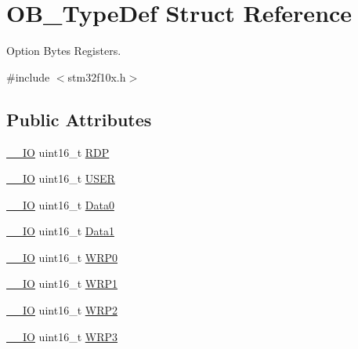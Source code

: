 \hypertarget{struct_o_b___type_def}{}\section{O\+B\+\_\+\+Type\+Def Struct Reference}
\label{struct_o_b___type_def}


Option Bytes Registers.  




{\ttfamily \#include $<$stm32f10x.\+h$>$}

\subsection*{Public Attributes}
\begin{DoxyCompactItemize}
\item 
\hyperlink{core__sc300_8h_aec43007d9998a0a0e01faede4133d6be}{\+\_\+\+\_\+\+IO} uint16\+\_\+t \hyperlink{struct_o_b___type_def_ad9f9ae594003c39cc27f147e29a130bb}{R\+DP}
\item 
\hyperlink{core__sc300_8h_aec43007d9998a0a0e01faede4133d6be}{\+\_\+\+\_\+\+IO} uint16\+\_\+t \hyperlink{struct_o_b___type_def_ab0292062a80446c97dac24604bd8ed8e}{U\+S\+ER}
\item 
\hyperlink{core__sc300_8h_aec43007d9998a0a0e01faede4133d6be}{\+\_\+\+\_\+\+IO} uint16\+\_\+t \hyperlink{struct_o_b___type_def_a7570c0ba4b4d31c6061d595279e6b36e}{Data0}
\item 
\hyperlink{core__sc300_8h_aec43007d9998a0a0e01faede4133d6be}{\+\_\+\+\_\+\+IO} uint16\+\_\+t \hyperlink{struct_o_b___type_def_a4e0e4a89db7004fb08a8a19129e9970e}{Data1}
\item 
\hyperlink{core__sc300_8h_aec43007d9998a0a0e01faede4133d6be}{\+\_\+\+\_\+\+IO} uint16\+\_\+t \hyperlink{struct_o_b___type_def_acee93898f092604a871e52d64560e7a9}{W\+R\+P0}
\item 
\hyperlink{core__sc300_8h_aec43007d9998a0a0e01faede4133d6be}{\+\_\+\+\_\+\+IO} uint16\+\_\+t \hyperlink{struct_o_b___type_def_ad397993d8c149a64e3f2a8bc7ecdf1c5}{W\+R\+P1}
\item 
\hyperlink{core__sc300_8h_aec43007d9998a0a0e01faede4133d6be}{\+\_\+\+\_\+\+IO} uint16\+\_\+t \hyperlink{struct_o_b___type_def_a475b2347222db8e35d7ade1a881ca31c}{W\+R\+P2}
\item 
\hyperlink{core__sc300_8h_aec43007d9998a0a0e01faede4133d6be}{\+\_\+\+\_\+\+IO} uint16\+\_\+t \hyperlink{struct_o_b___type_def_ab8bdaebc42e051ff9911eb88dad75f92}{W\+R\+P3}
\end{DoxyCompactItemize}


